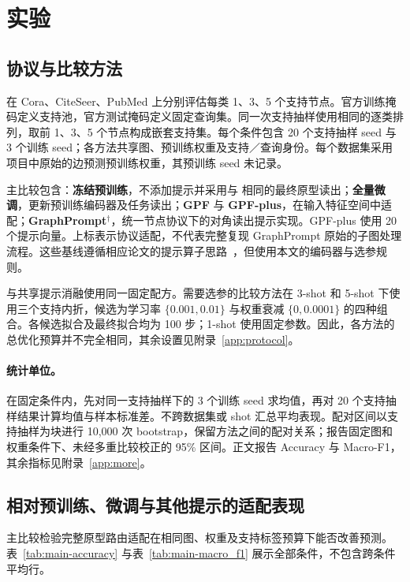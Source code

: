 \section{实验}
\subsection{协议与比较方法}
\label{sec:protocol}
在 Cora、CiteSeer、PubMed 上分别评估每类 1、3、5 个支持节点。官方训练掩码定义支持池，官方测试掩码定义固定查询集。同一次支持抽样使用相同的逐类排列，取前 1、3、5 个节点构成嵌套支持集。每个条件包含 20 个支持抽样 seed 与 3 个训练 seed；各方法共享图、预训练权重及支持／查询身份。每个数据集采用项目中原始的边预测预训练权重，其预训练 seed 未记录。

主比较包含：\textbf{冻结预训练}，不添加提示并采用与 \method 相同的最终原型读出；\textbf{全量微调}，更新预训练编码器及任务读出；\textbf{GPF} 与 \textbf{GPF-plus}，在输入特征空间中适配；\textbf{GraphPrompt$^{\dagger}$}，统一节点协议下的对角读出提示实现。GPF-plus 使用 20 个提示向量。上标表示协议适配，不代表完整复现 GraphPrompt 原始的子图处理流程。这些基线遵循相应论文的提示算子思路~\citep{gpf2023,graphprompt2023}，但使用本文的编码器与选参规则。

\method 与共享提示消融使用同一固定配方。需要选参的比较方法在 3-shot 和 5-shot 下使用三个支持内折，候选为学习率 $\{0.001,0.01\}$ 与权重衰减 $\{0,0.0001\}$ 的四种组合。各候选拟合及最终拟合均为 100 步；1-shot 使用固定参数。因此，各方法的总优化预算并不完全相同，其余设置见附录~\ref{app:protocol}。

\paragraph{统计单位。}
在固定条件内，先对同一支持抽样下的 3 个训练 seed 求均值，再对 20 个支持抽样结果计算均值与样本标准差。不跨数据集或 shot 汇总平均表现。配对区间以支持抽样为块进行 10,000 次 bootstrap，保留方法之间的配对关系；报告固定图和权重条件下、未经多重比较校正的 95\% 区间。正文报告 Accuracy 与 Macro-F1，其余指标见附录~\ref{app:more}。

\subsection{相对预训练、微调与其他提示的适配表现}
主比较检验完整原型路由适配在相同图、权重及支持标签预算下能否改善预测。表~\ref{tab:main-accuracy} 与表~\ref{tab:main-macro_f1} 展示全部条件，不包含跨条件平均行。



